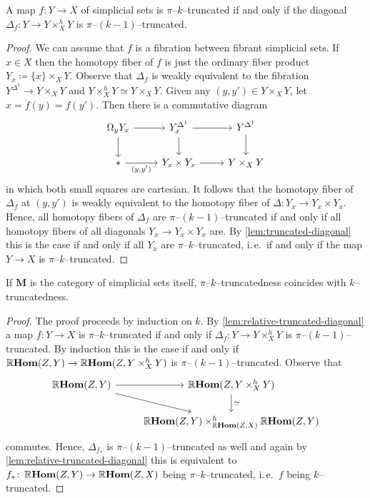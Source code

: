 \begin{lemma}\label{lem:relative-truncated-diagonal}
  A map \(f\colon Y\to X\) of simplicial sets is \(\pi\)--\(k\)--truncated if and only if the diagonal \(\Delta_{f}\colon Y\to Y\times^{h}_{X} Y\) is \(\pi\)--\((k-1)\)--truncated.
\end{lemma}
\begin{proof}
  We can assume that \(f\) is a fibration between fibrant simplicial sets. If \(x\in X\) then the homotopy fiber of \(f\) is just the ordinary fiber product \(Y_{x}\coloneqq \{x\}\times_{X} Y\). Observe that \(\Delta_{f}\) is weakly equivalent to the fibration \(Y^{\Delta^{1}}\to Y\times_{X} Y\) and \(Y\times_{X}^{h} Y \simeq Y\times_{X} Y\). Given any \((y, y')\in Y\times_{X} Y\), let \(x = f(y) = f(y')\). Then there is a commutative diagram
  \[
  \begin{tikzcd}
    \Omega_{y} Y_{x} \arrow[r] \arrow[d] & Y_{x}^{\Delta^{1}} \arrow[r] \arrow[d] & Y^{\Delta^{1}} \arrow[d] \\
    * \arrow[r, "{(y,y')}"'] & Y_{x}\times Y_{x} \arrow[r] & Y\times_{X} Y
  \end{tikzcd}
  \]
  in which both small squares are cartesian. It follows that the homotopy fiber of \(\Delta_{f}\) at \((y,y')\) is weakly equivalent to the homotopy fiber of \(\Delta\colon Y_{x}\to Y_{x}\times Y_{x}\). Hence, all homotopy fibers of \(\Delta_{f}\) are \(\pi\)--\((k-1)\)--truncated if and only if all homotopy fibers of all diagonals \(Y_{x}\to Y_{x}\times Y_{x}\) are. By \autoref{lem:truncated-diagonal} this is the case if and only if all \(Y_{x}\) are \(\pi\)--\(k\)--truncated, i.\,e.~if and only if the map \(Y\to X\) is \(\pi\)--\(k\)--truncated.
\end{proof}

\begin{corollary}\label{cor:truncatedness-makes-sense}
  If \(\mathbf{M}\) is the category of simplicial sets itself, \(\pi\)--\(k\)--truncatedness coincides with \(k\)--truncatedness.
\end{corollary}
\begin{proof}
  The proof proceeds by induction on \(k\). By \autoref{lem:relative-truncated-diagonal} a map \(f\colon Y\to X\) is \(\pi\)--\(k\)--truncated if and only if \(\Delta_{f}\colon Y\to Y\times_{X}^{h} Y\) is \(\pi\)--\((k-1)\)--truncated. By induction this is the case if and only if \(\operatorname{\mathbb{R}\textnormal{\bfseries Hom}}(Z,Y)\to \operatorname{\mathbb{R}\textnormal{\bfseries Hom}}(Z, Y\times_{X}^{h} Y)\) is \(\pi\)--\((k-1)\)--truncated. Observe that
  \[
  \begin{tikzcd}
    \RHom(Z,Y) \arrow[r] \arrow[dr] & \RHom(Z, Y\times^{h}_{X} Y) \arrow[d, "\simeq"] \\
    {} & \RHom(Z, Y)\times_{\RHom(Z, X)}^{h} \RHom(Z,Y)
  \end{tikzcd}
  \]
  commutes. Hence, \(\Delta_{f_{*}}\) is \(\pi\)--\((k-1)\)--truncated as well and again by \autoref{lem:relative-truncated-diagonal} this is equivalent to \(f_{*}\colon \operatorname{\mathbb{R}\textnormal{\bfseries Hom}}(Z, Y)\to\operatorname{\mathbb{R}\textnormal{\bfseries Hom}}(Z, X)\) being \(\pi\)--\(k\)--truncated, i.\,e.~\(f\) being \(k\)--truncated.
\end{proof}

